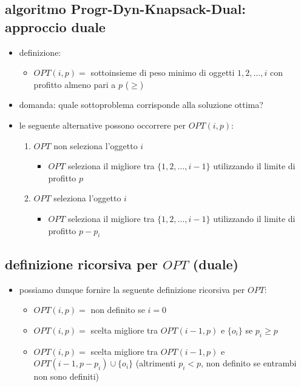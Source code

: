 
\subsection*{algoritmo Progr-Dyn-Knapsack-Dual: approccio duale}
\begin{flushleft}
	\begin{itemize}
		\item definizione:
		\begin{itemize}
			\item $OPT(i,p)=$ sottoinsieme di peso minimo di oggetti $1,2,\ldots,i$ con profitto almeno pari a $p$ ($\geq$)
		\end{itemize}
		\item domanda: quale sottoproblema corrisponde alla soluzione ottima?
		\item le seguente alternative possono occorrere per $OPT(i,p)$:
		\begin{enumerate}
			\item $OPT$ non seleziona l'oggetto $i$
			\begin{itemize}
				\item $OPT$ seleziona il migliore tra $\{1,2,\ldots,i-1\}$ utilizzando il limite di profitto $p$
			\end{itemize}
			\item $OPT$ seleziona l'oggetto $i$
			\begin{itemize}
				\item $OPT$ seleziona il migliore tra $\{1,2,\ldots,i-1\}$ utilizzando il limite di profitto $p-p_i$
			\end{itemize}
		\end{enumerate}
	\end{itemize}
\end{flushleft}


\subsection*{definizione ricorsiva per $OPT$ (duale)}
\begin{flushleft}
	\begin{itemize}
		\item possiamo dunque fornire la seguente definizione ricorsiva per $OPT$:
		\begin{itemize}
			\item $OPT(i,p)=$ non definito se $i=0$
			\item $OPT(i,p)=$ scelta migliore tra $OPT(i-1,p)$ e $\{o_i\}$ se $p_i\geq p$
			\item $OPT(i,p)=$ scelta migliore tra $OPT(i-1,p)$ e $OPT(i-1,p-p_i)\cup\{o_i\}$ (altrimenti $p_i<p$, non definito se entrambi non sono definiti)
		\end{itemize}
	\end{itemize}
\end{flushleft}

